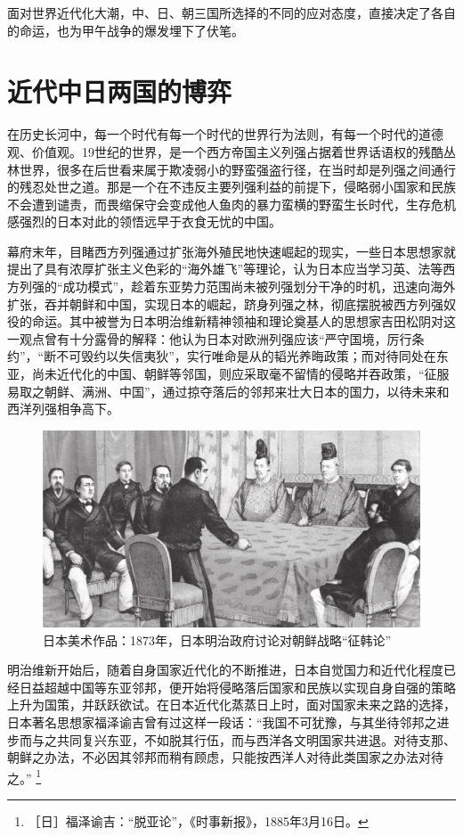 \documentclass[12pt,UTF8]{ctexbook}
\begin{document}
面对世界近代化大潮，中、日、朝三国所选择的不同的应对态度，直接决定了各自的命运，也为甲午战争的爆发埋下了伏笔。

\section{近代中日两国的博弈}

在历史长河中，每一个时代有每一个时代的世界行为法则，有每一个时代的道德观、价值观。19世纪的世界，是一个西方帝国主义列强占据着世界话语权的残酷丛林世界，很多在后世看来属于欺凌弱小的野蛮强盗行径，在当时却是列强之间通行的残忍处世之道。那是一个在不违反主要列强利益的前提下，侵略弱小国家和民族不会遭到谴责，而畏缩保守会变成他人鱼肉的暴力蛮横的野蛮生长时代，生存危机感强烈的日本对此的领悟远早于衣食无忧的中国。

幕府末年，目睹西方列强通过扩张海外殖民地快速崛起的现实，一些日本思想家就提出了具有浓厚扩张主义色彩的“海外雄飞”等理论，认为日本应当学习英、法等西方列强的“成功模式”，趁着东亚势力范围尚未被列强划分干净的时机，迅速向海外扩张，吞并朝鲜和中国，实现日本的崛起，跻身列强之林，彻底摆脱被西方列强奴役的命运。其中被誉为日本明治维新精神领袖和理论奠基人的思想家吉田松阴对这一观点曾有十分露骨的解释：他认为日本对欧洲列强应该“严守国境，厉行条约”，“断不可毁约以失信夷狄”，实行唯命是从的韬光养晦政策；而对待同处在东亚，尚未近代化的中国、朝鲜等邻国，则应采取毫不留情的侵略并吞政策，“征服易取之朝鲜、满洲、中国”，通过掠夺落后的邻邦来壮大日本的国力，以待未来和西洋列强相争高下。

\begin{figure}[htbp]
	\centering
	\includegraphics[width=0.7\linewidth]{4}
	\caption{日本美术作品：1873年，日本明治政府讨论对朝鲜战略“征韩论”}
	\label{fig:1}
\end{figure}

明治维新开始后，随着自身国家近代化的不断推进，日本自觉国力和近代化程度已经日益超越中国等东亚邻邦，便开始将侵略落后国家和民族以实现自身自强的策略上升为国策，并跃跃欲试。在日本近代化蒸蒸日上时，面对国家未来之路的选择，日本著名思想家福泽谕吉曾有过这样一段话：“我国不可犹豫，与其坐待邻邦之进步而与之共同复兴东亚，不如脱其行伍，而与西洋各文明国家共进退。对待支那、朝鲜之办法，不必因其邻邦而稍有顾虑，只能按西洋人对待此类国家之办法对待之。” \footnote{［日］福泽谕吉：“脱亚论”，《时事新报》，1885年3月16日。}
\end{document}
